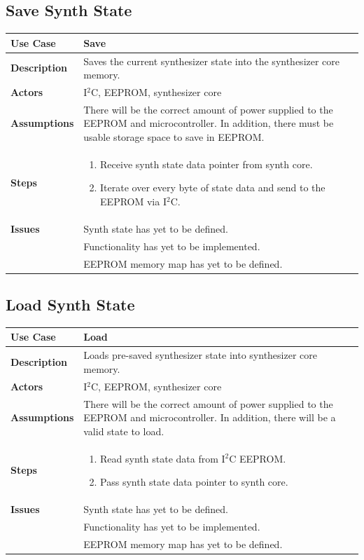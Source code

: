\documentclass{article}
\begin{document}
\subsection{Save Synth State}
\begin{tabular}{|p{1in}|p{5in}|}
\hline
\textbf{Use Case} & Save\\
\hline
\textbf{Description} & Saves the current synthesizer state into the synthesizer core memory.\\
\hline
\textbf{Actors} & I$^2$C, EEPROM, synthesizer core\\
\hline
\textbf{Assumptions} & There will be the correct amount of power supplied to the EEPROM and microcontroller.  In addition, there must be usable storage space to save in EEPROM.\\
\hline
\textbf{Steps} & \begin{enumerate}
\item Receive synth state data pointer from synth core.
\item Iterate over every byte of state data and send to the EEPROM via I$^2$C.
\end{enumerate}\\
\hline
\textbf{Issues} & Synth state has yet to be defined.\\
& Functionality has yet to be implemented.\\
& EEPROM memory map has yet to be defined.\\
\hline
\end{tabular}

\subsection{Load Synth State}
\begin{tabular}{|p{1in}|p{5in}|}
\hline
\textbf{Use Case} & Load\\
\hline
\textbf{Description} & Loads pre-saved synthesizer state into synthesizer core memory.\\
\hline
\textbf{Actors} & I$^{2}$C, EEPROM, synthesizer core\\
\hline
\textbf{Assumptions} & There will be the correct amount of power supplied to the EEPROM and microcontroller.  In addition, there will be a valid state to load.\\
\hline
\textbf{Steps} & \begin{enumerate}
\item Read synth state data from I$^2$C EEPROM.
\item Pass synth state data pointer to synth core.
\end{enumerate}\\
\hline
\textbf{Issues} & Synth state has yet to be defined.\\
& Functionality has yet to be implemented.\\
& EEPROM memory map has yet to be defined.\\
\hline
\end{tabular}
\end{document}
